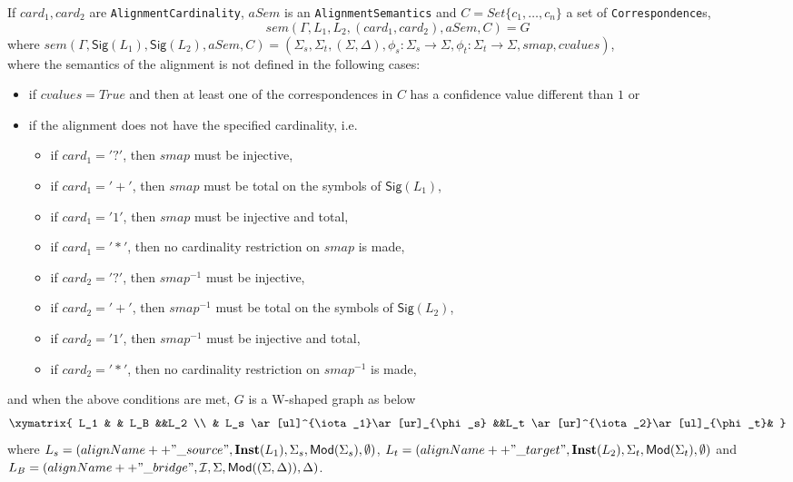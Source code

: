 \documentclass[10pt, a4paper]{isov2}
\newcommand*{\syntax}[1]{\texttt{#1}}
\newcommand{\Sig}{\mathsf{Sig}}
\newcommand{\Inst}{\ensuremath{\mathbf{Inst}}}
\begin{document}
If $card_1, card_2$ are \syntax{AlignmentCardinality}, 
$aSem$ is an \syntax{AlignmentSemantics}
and $C = Set\{c_1, \ldots, c_n\}$ a set of \syntax{Correspondence}s,
$$sem(\Gamma, L_1, L_2, (card_1,card_2), aSem, C)=
G$$
\noindent
where
$sem(\Gamma, \Sig(L_1),\Sig(L_2), aSem, C) = (\Sigma_s,\Sigma_t,(\Sigma,\Delta),\phi_s:\Sigma_s\to\Sigma,\phi_t:\Sigma_t\to\Sigma, smap, cvalues)$,\\
where the semantics of the alignment is not defined in the following cases:
\begin{itemize}
\item
if $cvalues = True$ and then at least one of the correspondences in $C$ has a confidence value different than $1$ or
\item if the alignment does not have the specified cardinality, i.e.
\begin{itemize}
\item if $card_1 = '?'$, then $smap$ must be injective,
\item if $card_1 = '+'$, then $smap$ must be total on the symbols of $\Sig(L_1)$,
\item if $card_1 = '1'$, then $smap$ must be injective and total,
\item if $card_1 = '*'$, then no cardinality restriction on $smap$ is made,
\end{itemize}
\begin{itemize}
\item if $card_2 = '?'$, then $smap^{-1}$ must be injective,
\item if $card_2 = '+'$, then $smap^{-1}$ must be total on the symbols of $\Sig(L_2)$,
\item if $card_2 = '1'$, then $smap^{-1}$ must be injective and total,
\item if $card_2 = '*'$, then no cardinality restriction on $smap^{-1}$ is made,
\end{itemize}
\end{itemize}
\noindent and when the above conditions are met,  
$G$ is a W-shaped graph as below
$$
\xymatrix{
L_1 & &  L_B &&L_2 \\
 & L_s \ar[ul]^{\iota_1}\ar[ur]_{\phi_s} &&L_t \ar[ur]^{\iota_2}\ar[ul]_{\phi_t}& 
}
$$
where
$L_s = (alignName++"\_source", \Inst(L_1) ,\Sigma_s,\Mod(\Sigma_s),\emptyset)$,
$L_t = (alignName++"\_target", \Inst(L_2) ,\Sigma_t,\Mod(\Sigma_t),\emptyset)$
and
$L_B = (alignName++"\_bridge", {\cal I} ,\Sigma,\mathsf{Mod}((\Sigma,\Delta)),\Delta)$.

\end{document}
